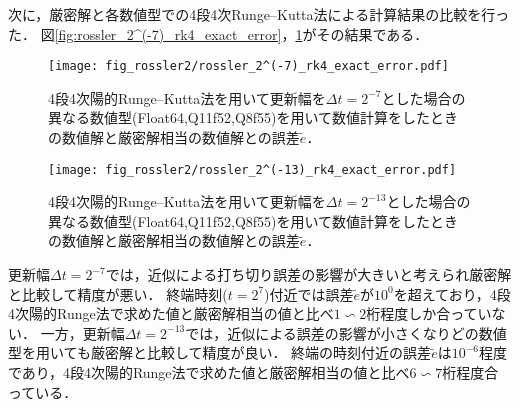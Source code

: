 次に，厳密解と各数値型での4段4次Runge--Kutta法による計算結果の比較を行った．
図\ref{fig:rossler_2^(-7)_rk4_exact_error}，\ref{fig:rossler_2^(-13)_rk4_exact_error}がその結果である．\\
\begin{figure}[H]
    \centering
    \begin{minipage}[b]{0.48\columnwidth}
        \centering
        \texttt{[image: fig\_rossler2/rossler\_2^(-7)\_rk4\_exact\_error.pdf]}
        \caption{4段4次陽的Runge--Kutta法を用いて更新幅を$\Delta t = 2^{-7}$とした場合の異なる数値型(Float64,Q11f52,Q8f55)を用いて数値計算をしたときの数値解と厳密解相当の数値解との誤差$\tilde{e}$．}   
        \label{fig:rossler_2^(-7)_rk4_exact_error}
    \end{minipage}
    \hspace{0.01\columnwidth}
    \begin{minipage}[b]{0.48\columnwidth}
        \centering
        \texttt{[image: fig\_rossler2/rossler\_2^(-13)\_rk4\_exact\_error.pdf]}
        \caption{4段4次陽的Runge--Kutta法を用いて更新幅を$\Delta t =  2^{-13}$とした場合の異なる数値型(Float64,Q11f52,Q8f55)を用いて数値計算をしたときの数値解と厳密解相当の数値解との誤差$\tilde{e}$．}
        \label{fig:rossler_2^(-13)_rk4_exact_error}
    \end{minipage}
\end{figure}
更新幅$\Delta t = 2^{-7}$では，近似による打ち切り誤差の影響が大きいと考えられ厳密解と比較して精度が悪い．
終端時刻($t=2^7$)付近では誤差$\tilde{e}$が$10^0$を超えており，4段4次陽的Runge法で求めた値と厳密解相当の値と比べ$1\backsim2$桁程度しか合っていない．
一方，更新幅$\Delta t =  2^{-13}$では，近似による誤差の影響が小さくなりどの数値型を用いても厳密解と比較して精度が良い．
終端の時刻付近の誤差$\tilde{e}$は$10^{-6}$程度であり，4段4次陽的Runge法で求めた値と厳密解相当の値と比べ$6\backsim7$桁程度合っている．

